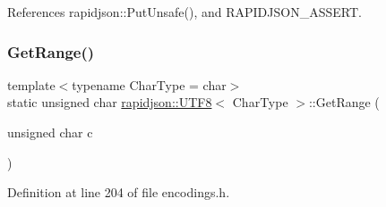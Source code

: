 References rapidjson\+::\+Put\+Unsafe(), and R\+A\+P\+I\+D\+J\+S\+O\+N\+\_\+\+A\+S\+S\+E\+RT.

\mbox{\label{structrapidjson_1_1_u_t_f8_af3510e51d62eed8e64f5c162003d0c7e}} 
\subsubsection{\texorpdfstring{GetRange()}{GetRange()}}
{\footnotesize\ttfamily template$<$typename Char\+Type  = char$>$ \\
static unsigned char \mbox{\hyperlink{structrapidjson_1_1_u_t_f8}{rapidjson\+::\+U\+T\+F8}}$<$ Char\+Type $>$\+::Get\+Range (\begin{DoxyParamCaption}\item[{unsigned char}]{c }\end{DoxyParamCaption})\hspace{0.3cm}{\ttfamily [static]}}



Definition at line 204 of file encodings.\+h.


